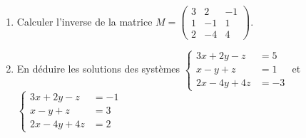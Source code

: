 \documentclass[12pt,a4paper]{report}
\newcounter{exo}[section]
\begin{document}
\exo
\begin{enumerate}
	\item Calculer l'inverse de la matrice $M=
	\begin{pmatrix}
		3&2&-1\\1&-1&1\\2&-4&4
	\end{pmatrix}$.
	\item En déduire les solutions des systèmes 
	$\left\{ \begin{array}{rl}
		3x+2y-z&=5\\
		x-y+z&=1\\
		2x-4y+4z&=-3
	\end{array} \right.$ et 
	$\left\{ \begin{array}{rl}
		3x+2y-z&=-1\\
		x-y+z&=3\\
		2x-4y+4z&=2
	\end{array} \right.$

\end{enumerate}

\exo 
\end{document}
